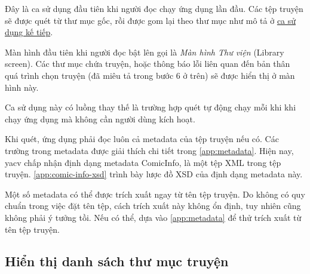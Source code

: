 \documentclass[../../thesis]{subfiles}
\begin{document}
Đây là ca sử dụng đầu tiên khi người đọc chạy ứng dụng lần đầu. Các tệp truyện
sẽ được quét từ thư mục gốc, rồi được gom lại theo thư mục như mô tả ở
\hyperref[sec:show-comics-in-folder]{ca sử dụng kế tiếp}.

Màn hình đầu tiên khi người đọc bật lên gọi là \emph{Màn hình Thư viện} (Library
screen). Các thư mục chứa truyện, hoặc thông báo lỗi liên quan đến bản thân quá
trình chọn truyện (đã miêu tả trong bước 6 ở trên) sẽ được hiển thị ở màn hình
này.

Ca sử dụng này có luồng thay thế là trường hợp quét tự động chạy mỗi khi khi
chạy ứng dụng mà không cần người dùng kích hoạt.

Khi quét, ứng dụng phải đọc luôn cả metadata của tệp truyện nếu có. Các trường
trong metadata được giải thích chi tiết trong \autoref{app:metadata}. Hiện nay,
yacv chấp nhận định dạng metadata ComicInfo, là một tệp XML trong tệp truyện.
\autoref{app:comic-info-xsd} trình bày lược đồ XSD của định dạng metadata này.

Một số metadata có thể được trích xuất ngay từ tên tệp truyện. Do không có quy
chuẩn trong việc đặt tên tệp, cách trích xuất này không ổn định, tuy nhiên cũng
không phải ý tưởng tồi. Nếu có thể, dựa vào \autoref{app:metadata} để thử trích
xuất từ tên tệp truyện.

\subsection{Hiển thị danh sách thư mục truyện}\label{sec:show-folders-inside-library}
\end{document}

